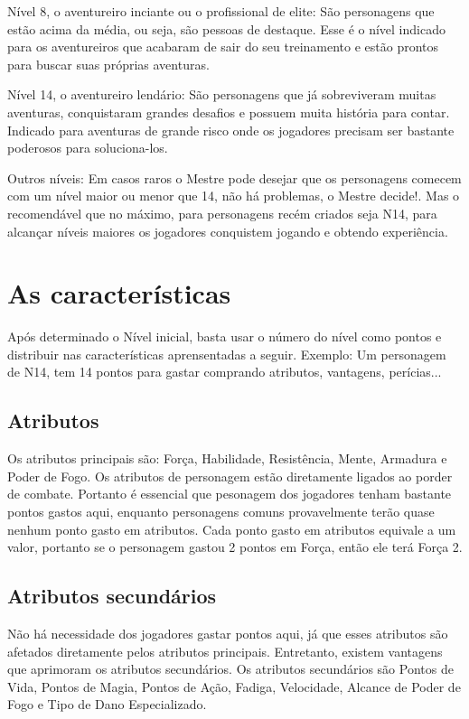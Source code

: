 Nível 8, o aventureiro inciante ou o profissional de elite: São personagens que estão acima da média, ou seja, são pessoas de destaque. Esse é o nível indicado para os aventureiros que acabaram de sair do seu treinamento e estão prontos para buscar suas próprias aventuras.

Nível 14, o aventureiro lendário: São personagens que já sobreviveram muitas aventuras, conquistaram grandes desafios e possuem muita história para contar. Indicado para aventuras de grande risco onde os jogadores precisam ser bastante poderosos para soluciona-los.

Outros níveis: Em casos raros o Mestre pode desejar que os personagens comecem com um nível maior ou menor que 14, não há problemas, o Mestre decide!. Mas o recomendável que no máximo, para personagens recém criados seja N14, para alcançar níveis maiores os jogadores conquistem jogando e obtendo experiência.

\section{As características}

Após determinado o Nível inicial, basta usar o número do nível como pontos e distribuir nas características aprensentadas a seguir. Exemplo: Um personagem de N14, tem 14 pontos para gastar comprando atributos, vantagens, perícias...

\subsection{Atributos}

Os atributos principais são: Força, Habilidade, Resistência, Mente, Armadura e Poder de Fogo. Os atributos de personagem estão diretamente ligados ao porder de combate. Portanto é essencial que pesonagem dos jogadores tenham bastante pontos gastos aqui, enquanto personagens comuns provavelmente terão quase nenhum ponto gasto em atributos. Cada ponto gasto em atributos equivale a um valor, portanto se o personagem gastou 2 pontos em Força, então ele terá Força 2.

\subsection{Atributos secundários}

Não há necessidade dos jogadores gastar pontos aqui, já que esses atributos são afetados diretamente pelos atributos principais. Entretanto, existem vantagens que aprimoram os atributos secundários. Os atributos secundários são Pontos de Vida, Pontos de Magia, Pontos de Ação, Fadiga, Velocidade, Alcance de Poder de Fogo e Tipo de Dano Especializado.

